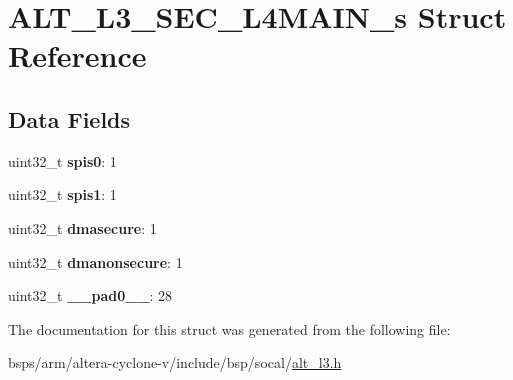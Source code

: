 \hypertarget{structALT__L3__SEC__L4MAIN__s}{}\section{A\+L\+T\+\_\+\+L3\+\_\+\+S\+E\+C\+\_\+\+L4\+M\+A\+I\+N\+\_\+s Struct Reference}
\label{structALT__L3__SEC__L4MAIN__s}
\subsection*{Data Fields}
\begin{DoxyCompactItemize}
\item 
\mbox{\label{structALT__L3__SEC__L4MAIN__s_ab414333f015fb44d7a3cc42411c69e23}} 
uint32\+\_\+t {\bfseries spis0}\+: 1
\item 
\mbox{\label{structALT__L3__SEC__L4MAIN__s_a5b0e0dca1ff46487e75f13b8b41f9d5a}} 
uint32\+\_\+t {\bfseries spis1}\+: 1
\item 
\mbox{\label{structALT__L3__SEC__L4MAIN__s_a220311bb8b1a416b599c1b03fbd09894}} 
uint32\+\_\+t {\bfseries dmasecure}\+: 1
\item 
\mbox{\label{structALT__L3__SEC__L4MAIN__s_a967b471ce91453d37a5e6127b7cc1e76}} 
uint32\+\_\+t {\bfseries dmanonsecure}\+: 1
\item 
\mbox{\label{structALT__L3__SEC__L4MAIN__s_a9486cc6815f038237719c43d71d30891}} 
uint32\+\_\+t {\bfseries \+\_\+\+\_\+pad0\+\_\+\+\_\+}\+: 28
\end{DoxyCompactItemize}


The documentation for this struct was generated from the following file\+:\begin{DoxyCompactItemize}
\item 
bsps/arm/altera-\/cyclone-\/v/include/bsp/socal/\mbox{\hyperlink{alt__l3_8h}{alt\+\_\+l3.\+h}}\end{DoxyCompactItemize}
